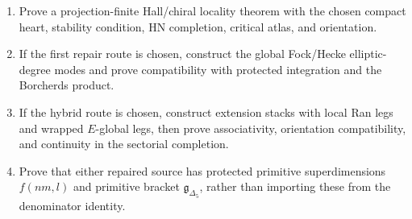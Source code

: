 \begin{enumerate}
\item Prove a projection-finite Hall/chiral locality theorem with the
chosen compact heart, stability condition, HN completion, critical atlas,
and orientation.
\item If the first repair route is chosen, construct the global
Fock/Hecke elliptic-degree modes and prove compatibility with protected
integration and the Borcherds product.
\item If the hybrid route is chosen, construct extension stacks with
local Ran legs and wrapped \(E\)-global legs, then prove associativity,
orientation compatibility, and continuity in the sectorial completion.
\item Prove that either repaired source has protected primitive
superdimensions \(f(nm,l)\) and primitive bracket
\(\mathfrak g_{\Delta_5}\), rather than importing these from the
denominator identity.
\end{enumerate}
